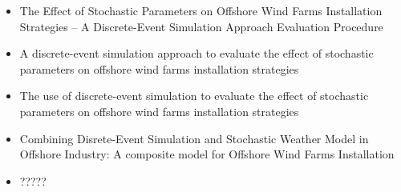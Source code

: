 \begin{titles}
\begin{itemize}
\item The Effect of Stochastic Parameters on Offshore Wind Farms Installation Strategies -- A Discrete-Event Simulation Approach Evaluation Procedure
\item A discrete-event simulation approach to evaluate the effect of stochastic parameters on offshore wind farms installation strategies
\item The use of discrete-event simulation to evaluate the effect of stochastic parameters on offshore wind farms installation strategies
\item Combining Disrete-Event Simulation and Stochastic Weather Model in Offshore Industry: A composite model for Offshore Wind Farms Installation
\item ?????
\end{itemize}
\end{titles}